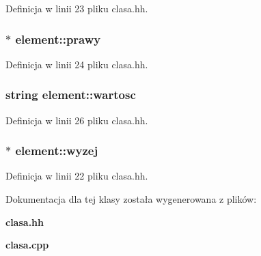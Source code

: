 \-Definicja w linii 23 pliku clasa.\-hh.

\subsubsection[{prawy}]{$\ast$ {\bf element\-::prawy}}\label{classelement_a98f9661f193070ccd39dd5989e5635a4}


\-Definicja w linii 24 pliku clasa.\-hh.

\subsubsection[{wartosc}]{\setlength{\rightskip}{0pt plus 5cm}string {\bf element\-::wartosc}}\label{classelement_ae33073625c349adb76caf9b5e0df0134}


\-Definicja w linii 26 pliku clasa.\-hh.

\subsubsection[{wyzej}]{$\ast$ {\bf element\-::wyzej}}\label{classelement_a57da302fce7645e1c23073911ae1f522}


\-Definicja w linii 22 pliku clasa.\-hh.



\-Dokumentacja dla tej klasy została wygenerowana z plików\-:\begin{DoxyCompactItemize}
\item 
{\bf clasa.\-hh}\item 
{\bf clasa.\-cpp}\end{DoxyCompactItemize}
